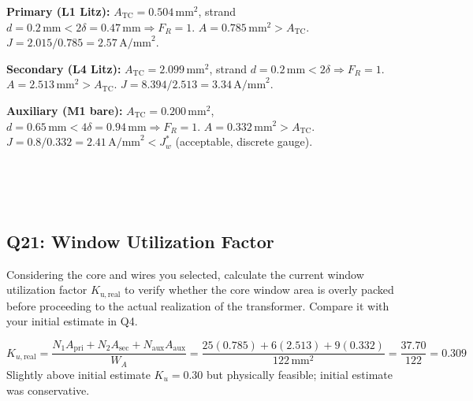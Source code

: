 \documentclass{PELsmallreport}
\begin{document}
\begin{framed}
	\vspace{2em}
	\textbf{Primary (L1 Litz):} $A_\mathrm{TC}=0.504\,\mathrm{mm}^2$, strand $d=0.2\,\mathrm{mm}<2\delta=0.47\,\mathrm{mm}\Rightarrow F_R=1$. $A=0.785\,\mathrm{mm}^2>A_\mathrm{TC}$. $J=2.015/0.785=2.57\,\mathrm{A/mm}^2$.

\textbf{Secondary (L4 Litz):} $A_\mathrm{TC}=2.099\,\mathrm{mm}^2$, strand $d=0.2\,\mathrm{mm}<2\delta\Rightarrow F_R=1$. $A=2.513\,\mathrm{mm}^2>A_\mathrm{TC}$. $J=8.394/2.513=3.34\,\mathrm{A/mm}^2$.

\textbf{Auxiliary (M1 bare):} $A_\mathrm{TC}=0.200\,\mathrm{mm}^2$, $d=0.65\,\mathrm{mm}<4\delta=0.94\,\mathrm{mm}\Rightarrow F_R=1$. $A=0.332\,\mathrm{mm}^2>A_\mathrm{TC}$. $J=0.8/0.332=2.41\,\mathrm{A/mm}^2<J_w^*$ (acceptable, discrete gauge).
	\vspace{2em}
\end{framed}

 \quad 
{}  \\ 
 \quad 
{} \\ 
 \quad 
{}
\hfill{}\\








\subsection{Q21: Window Utilization Factor} 
Considering the core and wires you selected, calculate the current window utilization factor $K_\mathrm{u,real}$ to verify whether the core window area is overly packed before proceeding to the actual realization of the transformer. 
Compare it with your initial estimate in Q4. 

\begin{framed}
	\vspace{2em}
	\begin{equation}
    K_{u,\mathrm{real}} = \frac{N_1A_\mathrm{pri}+N_2A_\mathrm{sec}+N_\mathrm{aux}A_\mathrm{aux}}{W_A}
    =\frac{25(0.785)+6(2.513)+9(0.332)}{122\,\mathrm{mm}^2}=\frac{37.70}{122}=0.309
\end{equation}
Slightly above initial estimate $K_u=0.30$ but physically feasible; initial estimate was conservative.
	\vspace{2em}
\end{framed}
\end{document}
